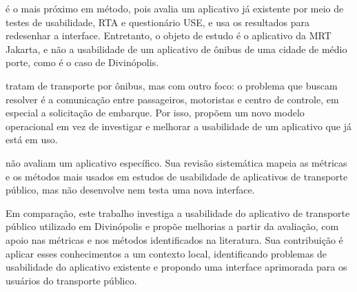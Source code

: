  é o mais próximo em método, pois avalia um aplicativo já existente por meio de testes de usabilidade, RTA e questionário USE, e usa os resultados para redesenhar a interface. Entretanto, o objeto de estudo é o aplicativo da MRT Jakarta, e não a usabilidade de um aplicativo de ônibus de uma cidade de médio porte, como é o caso de Divinópolis.

 tratam de transporte por ônibus, mas com outro foco: o problema que buscam resolver é a comunicação entre passageiros, motoristas e centro de controle, em especial a solicitação de embarque. Por isso, propõem um novo modelo operacional em vez de investigar e melhorar a usabilidade de um aplicativo que já está em uso.

 não avaliam um aplicativo específico. Sua revisão sistemática mapeia as métricas e os métodos mais usados em estudos de usabilidade de aplicativos de transporte público, mas não desenvolve nem testa uma nova interface.

Em comparação, este trabalho investiga a usabilidade do aplicativo de transporte público utilizado em Divinópolis e propõe melhorias a partir da avaliação, com apoio nas métricas e nos métodos identificados na literatura. Sua contribuição é aplicar esses conhecimentos a um contexto local, identificando problemas de usabilidade do aplicativo existente e propondo uma interface aprimorada para os usuários do transporte público.
